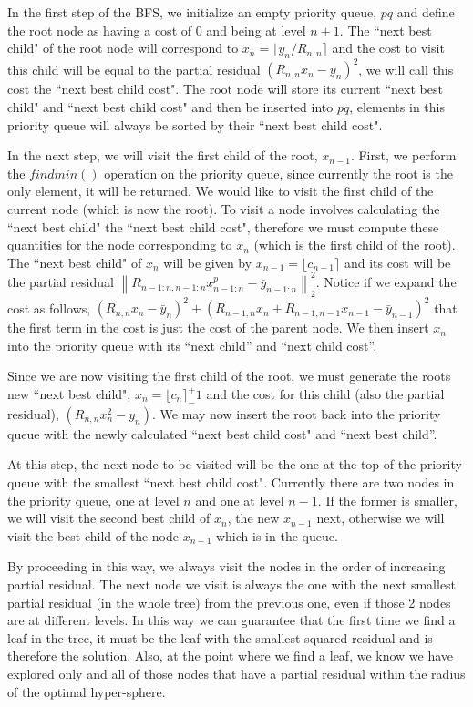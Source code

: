 \documentclass[12pt,Bold,letterpaper]{mcgilletdclass}
\begin{document}
In the first step of the BFS, we initialize an empty priority queue, $pq$ and define the root node as having a cost of $0$ and being at level $n+1$. The ``next best child" of the root node will correspond to $x_n = \lfloor \bar{y}_n/R_{n,n} \rceil$ and the cost to visit this child will be equal to the partial residual $(R_{n,n}x_n - \bar{y}_n)^2$, we will call this cost the ``next best child cost". The root node will store its current ``next best child" and ``next best child cost" and then be inserted into $pq$, elements in this priority queue will always be sorted by their ``next best child cost".

In the next step, we will visit the first child of the root, $x_{n-1}$. First, we perform the $findmin()$ operation on the priority queue, since currently the root is the only element, it will be returned. We would like to visit the first child of the current node (which is now the root). To visit a node involves calculating the ``next best child" the ``next best child cost", therefore we must compute these quantities for the node corresponding to $x_{n}$ (which is the first child of the root). The ``next best child" of $x_n$ will be given by $x_{n-1} = \lfloor c_{n-1} \rceil$ and its cost  will be the partial residual $\left \| R_{n-1:n,n-1:n}x_{n-1:n}^p - \bar{y}_{n-1:n}\right \|_2^2$. Notice if we expand the cost as follows, $(R_{n,n}x_n - \bar{y}_n)^2 + (R_{n-1,n}x_n + R_{n-1,n-1}x_{n-1} - \bar{y}_{n-1})^2$ that the first term in the cost is just the cost of the parent node. We then insert $x_n$ into the priority queue with its ``next child'' and ``next child cost''.

Since we are now visiting the first child of the root, we must generate the roots new ``next best child", $x_n = \lfloor c_n \rceil ^+_- 1$ and the cost for this child (also the partial residual), $(R_{n,n}x_n^2 - y_n)$. We may now insert the root back into the priority queue with the newly calculated ``next best child cost" and ``next best child''.
 
At this step, the next node to be visited will be the one at the top of the priority queue with the smallest ``next best child cost". Currently there are two nodes in the priority queue, one at level $n$ and one at level $n-1$. If the former is smaller, we will visit the second best child of $x_n$, the new $x_{n-1}$ next, otherwise we will visit the best child of the node $x_{n-1}$ which is in the queue.

By proceeding in this way, we always visit the nodes in the order of increasing partial residual. The next node we visit is always the one with the next smallest partial residual (in the whole tree) from the previous one, even if those 2 nodes are at different levels. In this way we can guarantee that the first time we find a leaf in the tree, it must be the leaf with the smallest squared residual and is therefore the solution. Also, at the point where we find a leaf, we know we have explored only and all of those nodes that have a partial residual within the radius of the optimal hyper-sphere.
\end{document}
